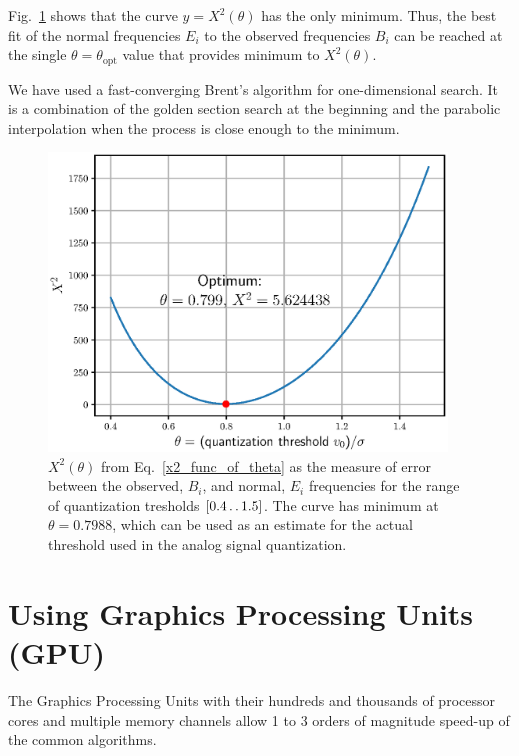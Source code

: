 \documentclass[letterpaper,twoside,12pt]{article}
\begin{document}
Fig.~\ref{optimum_theta} shows that the curve $y = X^2(\theta)$ has the only minimum. Thus, the best fit of the normal frequencies $E_i$ to the observed frequencies $B_i$ can be reached at the single $\theta=\theta_\text{opt}$ value that provides minimum to $X^2(\theta)$. 

We have used a fast-converging Brent's algorithm for one-dimensional search. It is a combination of the golden section search at the beginning and the parabolic interpolation when the process is close enough to the minimum.


\begin{figure}[ht!]
  \begin{center}
  \includegraphics[width=25pc]{fig_optimal_quantization_threshold.eps}
  \caption{\small $X^2(\theta)$ from Eq.~\eqref{x2_func_of_theta} as the measure of error between the observed, $B_i$, and normal, $E_i$ frequencies for the range of quantization tresholds $[0.4 \mathinner{\ldotp\ldotp}1.5]$. The curve has minimum at $\theta = 0.7988$, which can be used as an estimate for the actual threshold used in the analog signal quantization.}
  \label{optimum_theta}
  \end{center}
\end{figure}


\section{Using Graphics Processing Units (GPU)}

The Graphics Processing Units with their hundreds and thousands of processor cores and multiple memory channels allow 1 to 3 orders of magnitude speed-up of the common algorithms. 
\end{document}
